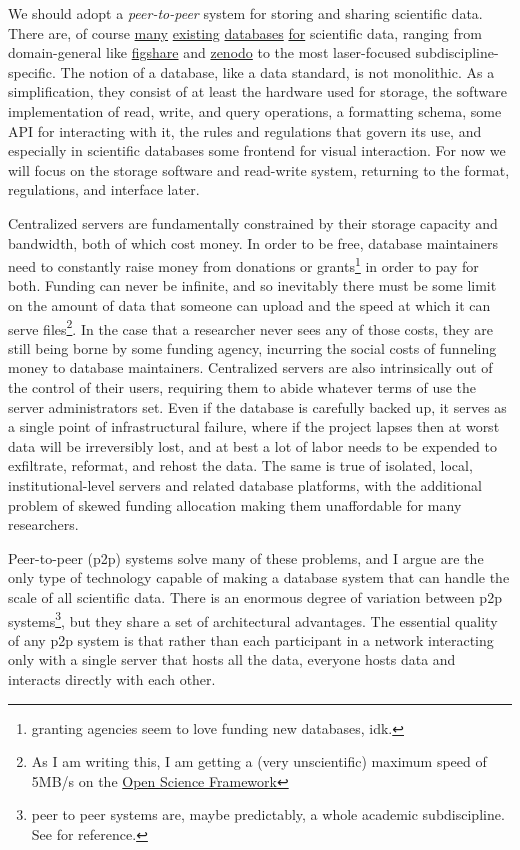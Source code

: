 \documentclass[10pt]{article}
\begin{document}
\begin{multicols}{2}
We should adopt a \emph{peer-to-peer} system for storing and sharing
scientific data. There are, of course
\href{https://www.dandiarchive.org/}{many}
\href{https://openneuro.org/}{existing}
\href{https://www.brainminds.riken.jp/}{databases}
\href{https://biccn.org/}{for} scientific data, ranging from
domain-general like \href{https://figshare.com/}{figshare} and
\href{https://zenodo.org/}{zenodo} to the most laser-focused
subdiscipline-specific. The notion of a database, like a data standard,
is not monolithic. As a simplification, they consist of at least the
hardware used for storage, the software implementation of read, write,
and query operations, a formatting schema, some API for interacting with
it, the rules and regulations that govern its use, and especially in
scientific databases some frontend for visual interaction. For now we
will focus on the storage software and read-write system, returning to
the format, regulations, and interface later.

Centralized servers are fundamentally constrained by their storage
capacity and bandwidth, both of which cost money. In order to be free,
database maintainers need to constantly raise money from donations or
grants\footnote{granting agencies seem to love funding new databases,
  idk.} in order to pay for both. Funding can never be infinite, and so
inevitably there must be some limit on the amount of data that someone
can upload and the speed at which it can serve files\footnote{As I am
  writing this, I am getting a (very unscientific) maximum speed of
  5MB/s on the \href{https://osf.io}{Open Science Framework}}. In the
case that a researcher never sees any of those costs, they are still
being borne by some funding agency, incurring the social costs of
funneling money to database maintainers. Centralized servers are also
intrinsically out of the control of their users, requiring them to abide
whatever terms of use the server administrators set. Even if the
database is carefully backed up, it serves as a single point of
infrastructural failure, where if the project lapses then at worst data
will be irreversibly lost, and at best a lot of labor needs to be
expended to exfiltrate, reformat, and rehost the data. The same is true
of isolated, local, institutional-level servers and related database
platforms, with the additional problem of skewed funding allocation
making them unaffordable for many researchers.

Peer-to-peer (p2p) systems solve many of these problems, and I argue are
the only type of technology capable of making a database system that can
handle the scale of all scientific data. There is an enormous degree of
variation between p2p systems\footnote{peer to peer systems are, maybe
  predictably, a whole academic subdiscipline. See \cite{shenHandbookPeertoPeerNetworking2010}  for reference.}, but they
share a set of architectural advantages. The essential quality of any
p2p system is that rather than each participant in a network interacting
only with a single server that hosts all the data, everyone hosts data
and interacts directly with each other.


\end{multicols}
\end{document}
